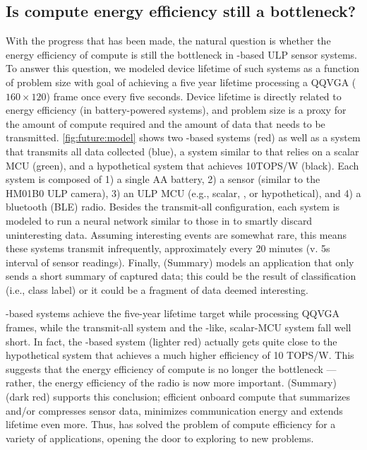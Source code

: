 \figFutureModel
\subsection{Is compute energy efficiency still a bottleneck?}
With the progress that has been made, the natural question is whether the energy efficiency of compute is still the bottleneck in \riptide-based ULP sensor systems.
% 
To answer this question, we modeled device lifetime of such systems as a function of problem size with goal of achieving a five year lifetime processing a QQVGA ($160\times120$) frame once every five seconds.
%
Device lifetime is directly related to energy efficiency (in battery-powered systems), and problem size is a proxy for the amount of compute required and the amount of data that needs to be transmitted.
% 
\autoref{fig:future:model} shows two \riptide-based systems (red) as well as a system that transmits all data collected (blue), a system similar to \sonic that relies on a scalar MCU (green), and a hypothetical system that achieves 10TOPS/W (black).
% 
Each system is composed of 1) a single AA battery, 2) a sensor (similar to the HM01B0 ULP camera), 3) an ULP MCU (e.g., scalar, \riptide, or hypothetical), and 4) a bluetooth (BLE) radio.
% 
Besides the transmit-all configuration, each system is modeled to run a neural network similar to those in \sonic to smartly discard uninteresting data.
% 
Assuming interesting events are somewhat rare, this means these systems transmit infrequently, approximately every $20$ minutes (v. 5s interval of sensor readings).
% 
Finally, \riptide (Summary) models an application that only sends a short summary of captured data; this could be the result of classification (i.e., class label) or it could be a fragment of data deemed interesting.

\riptide-based systems achieve the five-year lifetime target while processing QQVGA frames, while the transmit-all system and the \sonic-like, scalar-MCU system fall well short.
% 
In fact, the \riptide-based system (lighter red) actually gets quite close to the hypothetical system that achieves a much higher efficiency of 10 TOPS/W.
% 
This suggests that the energy efficiency of compute is no longer the bottleneck --- rather, the energy efficiency of the radio is now more important.
% 
\riptide (Summary) (dark red) supports this conclusion; efficient onboard compute that summarizes and/or compresses sensor data, minimizes communication energy and extends lifetime even more. 
% 
Thus, \riptide has solved the problem of compute efficiency for a variety of applications, opening the door to exploring to new problems.

